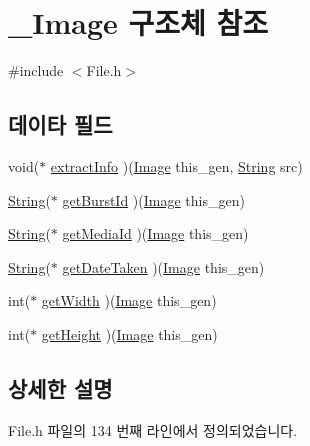 \hypertarget{struct___image}{\section{\-\_\-\-Image 구조체 참조}
\label{struct___image}
}


{\ttfamily \#include $<$File.\-h$>$}

\subsection*{데이타 필드}
\begin{DoxyCompactItemize}
\item 
void($\ast$ \hyperlink{struct___image_ab6c9b3a1c46d72f02fd0197b3d154b75}{extract\-Info} )(\hyperlink{_file_8h_aeb62f8214ffbffd373f144739b9eca60}{Image} this\-\_\-gen, \hyperlink{dit_8h_a2efe6d463d80744789f228f5dc4baa39}{String} src)
\item 
\hyperlink{dit_8h_a2efe6d463d80744789f228f5dc4baa39}{String}($\ast$ \hyperlink{struct___image_a43ccbbf065326a2647887464f16b7373}{get\-Burst\-Id} )(\hyperlink{_file_8h_aeb62f8214ffbffd373f144739b9eca60}{Image} this\-\_\-gen)
\item 
\hyperlink{dit_8h_a2efe6d463d80744789f228f5dc4baa39}{String}($\ast$ \hyperlink{struct___image_a3ebc4a1fcad891955f6bd315dbf79b87}{get\-Media\-Id} )(\hyperlink{_file_8h_aeb62f8214ffbffd373f144739b9eca60}{Image} this\-\_\-gen)
\item 
\hyperlink{dit_8h_a2efe6d463d80744789f228f5dc4baa39}{String}($\ast$ \hyperlink{struct___image_a170cc9a88ad9e65b2d8725d1370bc946}{get\-Date\-Taken} )(\hyperlink{_file_8h_aeb62f8214ffbffd373f144739b9eca60}{Image} this\-\_\-gen)
\item 
int($\ast$ \hyperlink{struct___image_ac1af259a21d8c67dab2729dc2ca8e6ab}{get\-Width} )(\hyperlink{_file_8h_aeb62f8214ffbffd373f144739b9eca60}{Image} this\-\_\-gen)
\item 
int($\ast$ \hyperlink{struct___image_a8958794ba1906035ca256305dc103399}{get\-Height} )(\hyperlink{_file_8h_aeb62f8214ffbffd373f144739b9eca60}{Image} this\-\_\-gen)
\end{DoxyCompactItemize}


\subsection{상세한 설명}


File.\-h 파일의 134 번째 라인에서 정의되었습니다.



